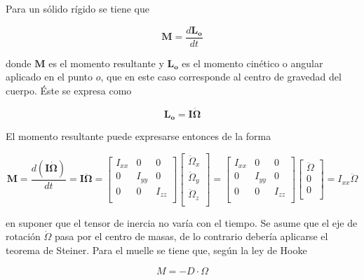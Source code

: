 \documentclass[twoside,11pt]{report}
\begin{document}
Para un sólido rígido se tiene que 

\begin{equation}
\mathbf{M}=\frac{d\mathbf{L_{o}}}{dt}
\end{equation}

donde $\mathbf{M}$ es el momento resultante y $\mathbf{L_{o}}$ es el momento cinético o angular aplicado en el punto $o$, que en este caso corresponde al centro de gravedad del cuerpo. Éste se expresa como

\begin{equation}
\mathbf{L_{o}}=\mathbf{I}\dot{\mathbf{\Omega}}
\end{equation}

El momento resultante puede expresarse entonces de la forma 

\begin{equation}
\mathbf{M}=\frac{d(\mathbf{I}\dot{\mathbf{\Omega}})}{dt}=\mathbf{I}\ddot{\mathbf{\Omega}}=\left[ \begin{array}{ccc}
I_{xx} & 0 & 0 \\
0 & I_{yy} & 0 \\
0 & 0 & I_{zz} \\
\end{array} \right]\left[ \begin{array}{c}
\ddot{\Omega}_{x} \\
\ddot{\Omega}_{y} \\
\ddot{\Omega}_{z} \\
\end{array} \right]=\left[ \begin{array}{ccc}
I_{xx} & 0 & 0 \\
0 & I_{yy} & 0 \\
0 & 0 & I_{zz} \\
\end{array} \right]\left[ \begin{array}{c}
\ddot{\Omega} \\
0 \\
0 \\
\end{array} \right] = I_{xx} \ddot{\Omega}
\label{53}
\end{equation}

en suponer que el tensor de inercia no varía con el tiempo. Se asume 
que el eje de rotación $\dot{\Omega}$ pasa por el centro de masas, de lo contrario debería aplicarse el teorema de Steiner. Para el muelle se tiene que, según la ley de Hooke

\begin{equation}
M=-D \cdot \Omega
\label{54}
\end{equation}
\end{document}
